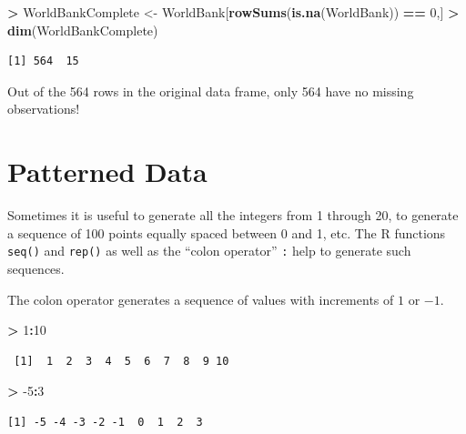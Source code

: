 \documentclass[
]{krantz}
\makeatletter
\newenvironment{Shaded}{\begin{snugshade}}{\end{snugshade}}
\newcommand{\DecValTok}[1]{\textcolor[rgb]{0.06,0.06,0.06}{#1}}
\newcommand{\KeywordTok}[1]{\textcolor[rgb]{0.27,0.27,0.27}{\textbf{#1}}}
\newcommand{\NormalTok}[1]{#1}
\newcommand{\OperatorTok}[1]{\textcolor[rgb]{0.43,0.43,0.43}{\textbf{#1}}}
\newcommand{\StringTok}[1]{\textcolor[rgb]{0.5,0.5,0.5}{#1}}
\newenvironment{kframe}{%
\medskip{}
\setlength{\fboxsep}{.8em}
 \def\at@end@of@kframe{}%
 \ifinner\ifhmode%
  \def\at@end@of@kframe{\end{minipage}}%
  \begin{minipage}{\columnwidth}%
 \fi\fi%
 \def\FrameCommand##1{\hskip\@totalleftmargin \hskip-\fboxsep
 \colorbox{shadecolor}{##1}\hskip-\fboxsep
     \hskip-\linewidth \hskip-\@totalleftmargin \hskip\columnwidth}%
 \MakeFramed {\advance\hsize-\width
   \@totalleftmargin\z@ \linewidth\hsize
   \@setminipage}}%
 {\par\unskip\endMakeFramed%
 \at@end@of@kframe}
\renewenvironment{Shaded}{\begin{kframe}}{\end{kframe}}
\makeatother
\begin{document}
\begin{Shaded}
\begin{Highlighting}[]
\OperatorTok{\textgreater{}}\StringTok{ }\NormalTok{WorldBankComplete \textless{}{-}}\StringTok{ }\NormalTok{WorldBank[}\KeywordTok{rowSums}\NormalTok{(}\KeywordTok{is.na}\NormalTok{(WorldBank)) }\OperatorTok{==}\StringTok{ }\DecValTok{0}\NormalTok{,]}
\OperatorTok{\textgreater{}}\StringTok{ }\KeywordTok{dim}\NormalTok{(WorldBankComplete)}
\end{Highlighting}
\end{Shaded}

\begin{verbatim}
[1] 564  15
\end{verbatim}

Out of the 564 rows in the original data frame, only 564 have no missing observations!

\hypertarget{patterned-data}{%
\section{Patterned Data}\label{patterned-data}}

Sometimes it is useful to generate all the integers from 1 through 20, to generate a sequence of 100 points equally spaced between 0 and 1, etc. The R functions \texttt{seq()} and \texttt{rep()} as well as the ``colon operator'' \texttt{:} help to generate such sequences.

The colon operator generates a sequence of values with increments of \(1\) or \(-1\).

\begin{Shaded}
\begin{Highlighting}[]
\OperatorTok{\textgreater{}}\StringTok{ }\DecValTok{1}\OperatorTok{:}\DecValTok{10}
\end{Highlighting}
\end{Shaded}

\begin{verbatim}
 [1]  1  2  3  4  5  6  7  8  9 10
\end{verbatim}

\begin{Shaded}
\begin{Highlighting}[]
\OperatorTok{\textgreater{}}\StringTok{ }\DecValTok{{-}5}\OperatorTok{:}\DecValTok{3}
\end{Highlighting}
\end{Shaded}

\begin{verbatim}
[1] -5 -4 -3 -2 -1  0  1  2  3
\end{verbatim}
\end{document}
